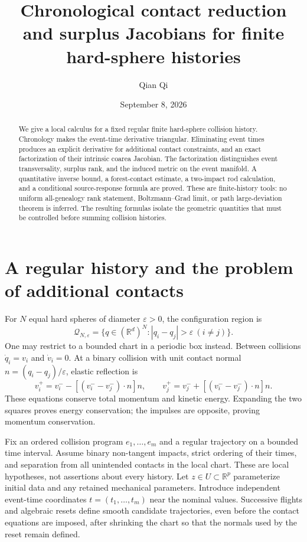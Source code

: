 \documentclass[11pt,reqno]{amsart}
\title[Chronological contact reduction]{Chronological contact reduction and surplus Jacobians for finite hard-sphere histories}
\author{Qian Qi}
\date{September 8, 2026}
\numberwithin{equation}{section}
\theoremstyle{remark}\newtheorem{remark}[theorem]{Remark}
\newcommand{\R}{\mathbb R}\newcommand{\dd}{\,\mathrm d}
\begin{document}
\begin{abstract}
We give a local calculus for a fixed regular finite hard-sphere collision history. Chronology makes the event-time derivative triangular. Eliminating event times produces an explicit derivative for additional contact constraints, and an exact factorization of their intrinsic coarea Jacobian. The factorization distinguishes event transversality, surplus rank, and the induced metric on the event manifold. A quantitative inverse bound, a forest-contact estimate, a two-impact rod calculation, and a conditional source-response formula are proved. These are finite-history tools: no uniform all-genealogy rank statement, Boltzmann--Grad limit, or path large-deviation theorem is inferred. The resulting formulas isolate the geometric quantities that must be controlled before summing collision histories.
\end{abstract}
\maketitle

\section{A regular history and the problem of additional contacts}
For $N$ equal hard spheres of diameter $\varepsilon>0$, the configuration region is
\[
 \mathcal Q_{N,\varepsilon}=\{q\in(\R^d)^N:|q_i-q_j|>\varepsilon\ (i\ne j)\}.
\]
One may restrict to a bounded chart in a periodic box instead. Between collisions $\dot q_i=v_i$ and $\dot v_i=0$. At a binary collision with unit contact normal $n=(q_i-q_j)/\varepsilon$, elastic reflection is
\[
 v_i^+=v_i^- -[(v_i^--v_j^-)\cdot n]n,
 \qquad v_j^+=v_j^- +[(v_i^--v_j^-)\cdot n]n.
\]
These equations conserve total momentum and kinetic energy. Expanding the two squares proves energy conservation; the impulses are opposite, proving momentum conservation.

Fix an ordered collision program $e_1,\ldots,e_m$ and a regular trajectory on a bounded time interval. Assume binary non-tangent impacts, strict ordering of their times, and separation from all unintended contacts in the local chart. These are local hypotheses, not assertions about every history. Let $z\in U\subset\R^p$ parameterize initial data and any retained mechanical parameters. Introduce independent event-time coordinates $t=(t_1,\ldots,t_m)$ near the nominal values. Successive flights and algebraic resets define smooth candidate trajectories, even before the contact equations are imposed, after shrinking the chart so that the normals used by the reset remain defined.
\end{document}
